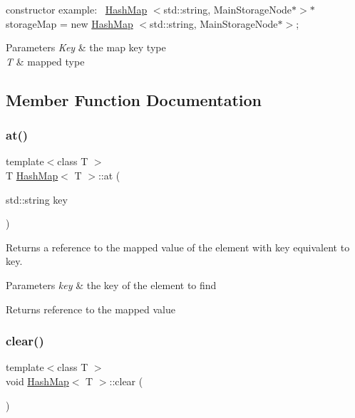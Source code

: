 constructor example\+:~\newline
\hyperlink{class_hash_map}{Hash\+Map} $<$std\+::string, Main\+Storage\+Node$\ast$$>$$\ast$ storage\+Map = new \hyperlink{class_hash_map}{Hash\+Map} $<$std\+::string, Main\+Storage\+Node$\ast$$>$; 
\begin{DoxyParams}{Parameters}
{\em Key} & the map key type \\
\hline
{\em T} & mapped type \\
\hline
\end{DoxyParams}


\subsection{Member Function Documentation}
\mbox{\label{class_hash_map_a385f0d379383ddbc05d72662b16568ed}} 
\subsubsection{\texorpdfstring{at()}{at()}}
{\footnotesize\ttfamily template$<$class T $>$ \\
T \hyperlink{class_hash_map}{Hash\+Map}$<$ T $>$\+::at (\begin{DoxyParamCaption}\item[{std\+::string}]{key }\end{DoxyParamCaption})}

Returns a reference to the mapped value of the element with key equivalent to key. 
\begin{DoxyParams}{Parameters}
{\em key} & the key of the element to find \\
\hline
\end{DoxyParams}
\begin{DoxyReturn}{Returns}
reference to the mapped value 
\end{DoxyReturn}
\mbox{\label{class_hash_map_a7b78aa9f52a7524edc644920dc90fa94}} 
\subsubsection{\texorpdfstring{clear()}{clear()}}
{\footnotesize\ttfamily template$<$class T $>$ \\
void \hyperlink{class_hash_map}{Hash\+Map}$<$ T $>$\+::clear (\begin{DoxyParamCaption}{ }\end{DoxyParamCaption})}

